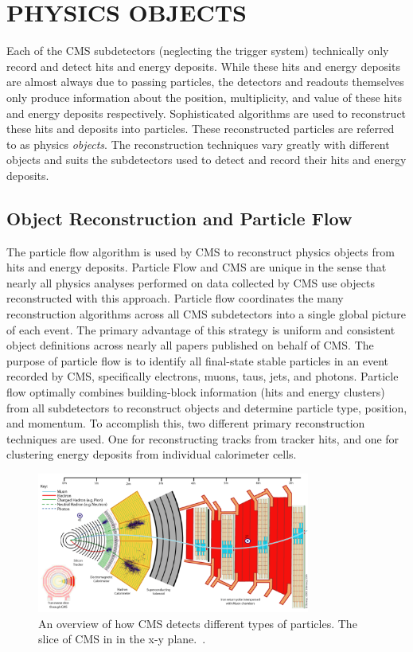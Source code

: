 %
%

\chapter{PHYSICS OBJECTS}
\label{chap:physics_objects}
Each of the CMS subdetectors (neglecting the trigger system) technically only record and detect hits and energy deposits. While these hits and energy deposits are almost
always due to passing particles, the detectors and readouts themselves only produce information about the position, multiplicity, and value of
these hits and energy deposits respectively. Sophisticated algorithms are used to reconstruct these hits and deposits into particles. These reconstructed particles are
referred to as physics \emph{objects}. The reconstruction techniques vary greatly with different objects and suits the subdetectors used to detect and record their
hits and energy deposits. 

\section{Object Reconstruction and Particle Flow}
The particle flow algorithm is used by CMS to reconstruct physics objects from hits and energy deposits. Particle Flow and CMS are unique in the sense
that nearly all physics analyses performed on data collected by CMS use objects reconstructed with this approach.
Particle flow coordinates the many reconstruction algorithms across all CMS subdetectors into a single global picture of each event. The primary advantage of this strategy is
uniform and consistent object definitions across nearly all papers published on behalf of CMS. The purpose of particle flow is to
identify all final-state stable particles in an event recorded by CMS, specifically electrons,
muons, taus, jets, and photons. Particle flow optimally combines building-block information (hits and energy clusters) from all subdetectors to reconstruct objects and
determine particle type, position, and momentum. To accomplish this, two different primary reconstruction techniques are used. One for reconstructing tracks from tracker hits,
and one for clustering energy deposits from individual calorimeter cells. 

\begin{figure}[hbtp]
 \begin{center}
   \includegraphics[width=0.8\textwidth]{ch4_figs/cms_particleflow.pdf}
   \caption[CMS slice in the x-y plane]{An overview of how CMS detects different types of particles. The slice of CMS in in the x-y plane.~\cite{cms_pflow_img}.}
   \label{fig:cms_pflow}
 \end{center}
\end{figure}

